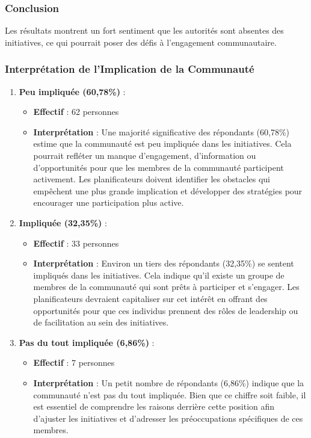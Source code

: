 \documentclass[
]{article}
\providecommand{\tightlist}{%
  \setlength{\itemsep}{0pt}\setlength{\parskip}{0pt}}
\begin{document}
\subsubsection{Conclusion}\label{conclusion-8}

Les résultats montrent un fort sentiment que les autorités sont absentes
des initiatives, ce qui pourrait poser des défis à l'engagement
communautaire.

\subsubsection{Interprétation de l'Implication de la
Communauté}\label{interpruxe9tation-de-limplication-de-la-communautuxe9}

\begin{enumerate}
\def\labelenumi{\arabic{enumi}.}
\tightlist
\item
  \textbf{Peu impliquée (60,78\%)} :

  \begin{itemize}
  \tightlist
  \item
    \textbf{Effectif} : 62 personnes
  \item
    \textbf{Interprétation} : Une majorité significative des répondants
    (60,78\%) estime que la communauté est peu impliquée dans les
    initiatives. Cela pourrait refléter un manque d'engagement,
    d'information ou d'opportunités pour que les membres de la
    communauté participent activement. Les planificateurs doivent
    identifier les obstacles qui empêchent une plus grande implication
    et développer des stratégies pour encourager une participation plus
    active.
  \end{itemize}
\item
  \textbf{Impliquée (32,35\%)} :

  \begin{itemize}
  \tightlist
  \item
    \textbf{Effectif} : 33 personnes
  \item
    \textbf{Interprétation} : Environ un tiers des répondants (32,35\%)
    se sentent impliqués dans les initiatives. Cela indique qu'il existe
    un groupe de membres de la communauté qui sont prêts à participer et
    s'engager. Les planificateurs devraient capitaliser sur cet intérêt
    en offrant des opportunités pour que ces individus prennent des
    rôles de leadership ou de facilitation au sein des initiatives.
  \end{itemize}
\item
  \textbf{Pas du tout impliquée (6,86\%)} :

  \begin{itemize}
  \tightlist
  \item
    \textbf{Effectif} : 7 personnes
  \item
    \textbf{Interprétation} : Un petit nombre de répondants (6,86\%)
    indique que la communauté n'est pas du tout impliquée. Bien que ce
    chiffre soit faible, il est essentiel de comprendre les raisons
    derrière cette position afin d'ajuster les initiatives et d'adresser
    les préoccupations spécifiques de ces membres.
  \end{itemize}
\end{enumerate}
\end{document}
